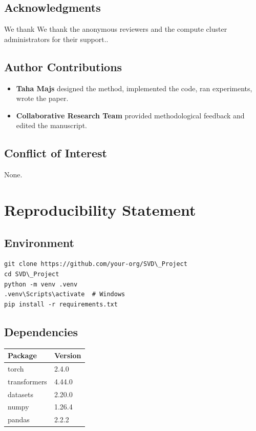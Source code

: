 \subsection{Acknowledgments}

We thank We thank the anonymous reviewers and the compute cluster administrators for their support..

\subsection{Author Contributions}

\begin{itemize}
\item \textbf{Taha Majs} designed the method, implemented the code, ran experiments,
  wrote the paper.
\item \textbf{Collaborative Research Team} provided methodological feedback and edited the manuscript.

\end{itemize}
\subsection{Conflict of Interest}

None.


\section{Reproducibility Statement}

\subsection{Environment}

\begin{lstlisting}
git clone https://github.com/your-org/SVD\_Project
cd SVD\_Project
python -m venv .venv
.venv\Scripts\activate  # Windows
pip install -r requirements.txt
\end{lstlisting}

\subsection{Dependencies}

\begin{table}[H]
\centering
\small
\begin{tabular}{ll}
\toprule
\textbf{Package} & \textbf{Version} \\
\midrule
torch & 2.4.0 \\
transformers & 4.44.0 \\
datasets & 2.20.0 \\
numpy & 1.26.4 \\
pandas & 2.2.2 \\
\bottomrule
\end{tabular}
\end{table}

